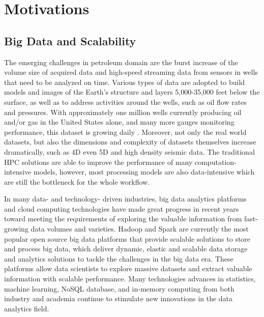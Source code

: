 

\section{Motivations}

\subsection{Big Data and Scalability}

The emerging challenges in petroleum domain are the burst increase of the volume size of acquired data and high-speed streaming data from sensors in wells that need to be analyzed on time. Various types of data are adopted to build models and images of the Earth's structure and layers 5,000-35,000 feet below the surface, as well as to address activities around the wells, such as oil flow rates and pressures. With approximately one million wells currently producing oil and/or gas in the United States alone, and many more gauges monitoring performance, this dataset is growing daily \cite{bigdataofindustry}. Moreover, not only the real world datasets, but also the dimensions and complexity of datasets themselves increase dramatically, such as 4D even 5D and high density seismic data. The traditional HPC solutions are able to improve the performance of many computation-intensive models, however,  most processing models are also data-intensive which are still the bottleneck for the whole workflow. 

In many data- and technology- driven industries, big data analytics platforms and cloud computing technologies have made great progress in recent years toward meeting the requirements of exploring the valuable information from fast-growing data volumes and varieties.  Hadoop and Spark are currently the most popular open source big data platforms that provide scalable solutions to store and process big data, which deliver dynamic, elastic and scalable data storage and analytics solutions to tackle the challenges in the big data era. These platforms allow data scientists to explore massive datasets and extract valuable information with scalable performance. Many technologies advances in statistics, machine learning, NoSQL database, and in-memory computing from both industry and academia continue to stimulate new innovations in the data analytics field.

